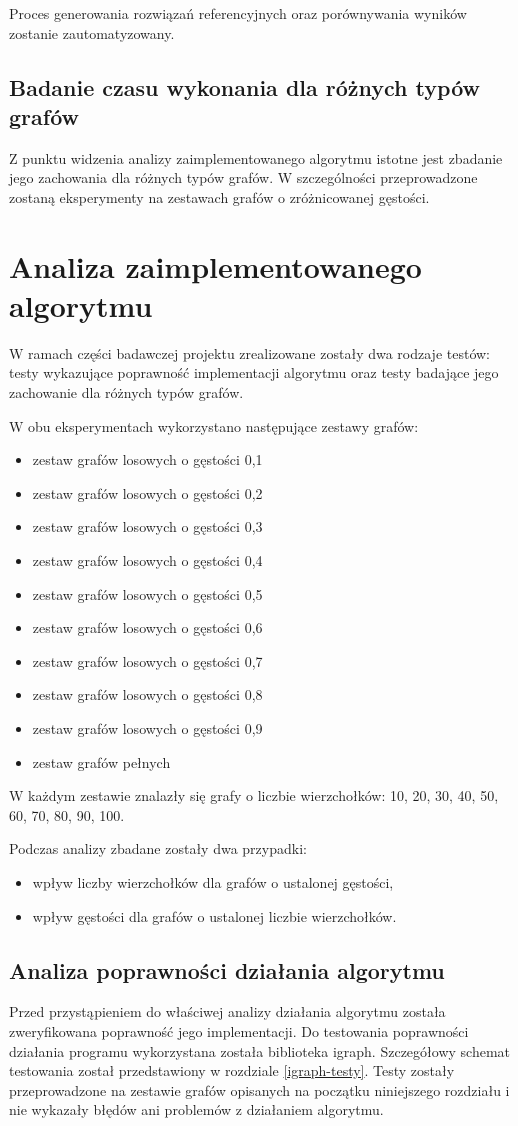 \documentclass[12pt, a4paper]{article}
\begin{document}
Proces generowania rozwiązań referencyjnych oraz porównywania wyników zostanie zautomatyzowany.
\subsection{Badanie czasu wykonania dla różnych typów grafów}
Z punktu widzenia analizy zaimplementowanego algorytmu istotne jest zbadanie jego zachowania dla różnych typów grafów. W szczególności przeprowadzone zostaną eksperymenty na zestawach grafów o zróżnicowanej gęstości.

\section{Analiza zaimplementowanego algorytmu}
W ramach części badawczej projektu zrealizowane zostały dwa rodzaje testów: testy wykazujące poprawność implementacji algorytmu oraz testy badające jego zachowanie dla różnych typów grafów.

W obu eksperymentach wykorzystano następujące zestawy grafów:
\begin{itemize}
	\item zestaw grafów losowych o gęstości 0,1
	\item zestaw grafów losowych o gęstości 0,2
	\item zestaw grafów losowych o gęstości 0,3
    \item zestaw grafów losowych o gęstości 0,4
	\item zestaw grafów losowych o gęstości 0,5
	\item zestaw grafów losowych o gęstości 0,6
	\item zestaw grafów losowych o gęstości 0,7
	\item zestaw grafów losowych o gęstości 0,8
	\item zestaw grafów losowych o gęstości 0,9
	\item zestaw grafów pełnych
\end{itemize}
W każdym zestawie znalazły się grafy o liczbie wierzchołków: 10, 20, 30, 40, 50, 60, 70, 80, 90, 100.

Podczas analizy zbadane zostały dwa przypadki:
\begin{itemize}
	\item wpływ liczby wierzchołków dla grafów o ustalonej gęstości,
	\item wpływ gęstości dla grafów o ustalonej liczbie wierzchołków.
\end{itemize}

\subsection{Analiza poprawności działania algorytmu}
Przed przystąpieniem do właściwej analizy działania algorytmu została zweryfikowana poprawność jego implementacji. Do testowania poprawności działania programu wykorzystana została biblioteka igraph. Szczegółowy schemat testowania został przedstawiony w rozdziale \ref{igraph-testy}.
Testy zostały przeprowadzone na zestawie grafów opisanych na początku niniejszego rozdziału i nie wykazały błędów ani problemów z działaniem algorytmu.
\end{document}
